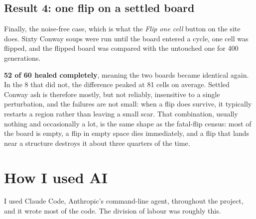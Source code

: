\documentclass[11pt]{article}
\begin{document}
\subsection{Result 4: one flip on a settled board}

Finally, the noise-free case, which is what the \emph{Flip one cell} button on the site does. Sixty
Conway soups were run until the board entered a cycle, one cell was flipped, and the flipped board
was compared with the untouched one for 400 generations.

\textbf{52 of 60 healed completely}, meaning the two boards became identical again. In the 8 that did
not, the difference peaked at 81 cells on average. Settled Conway ash is therefore mostly, but not
reliably, insensitive to a single perturbation, and the failures are not small: when a flip does
survive, it typically restarts a region rather than leaving a small scar. That combination, usually
nothing and occasionally a lot, is the same shape as the fatal-flip census: most of the board is
empty, a flip in empty space dies immediately, and a flip that lands near a structure destroys it
about three quarters of the time.


\section{How I used AI}

I used Claude Code, Anthropic's command-line agent, throughout the project, and it wrote most of the
code. The division of labour was roughly this.
\end{document}
